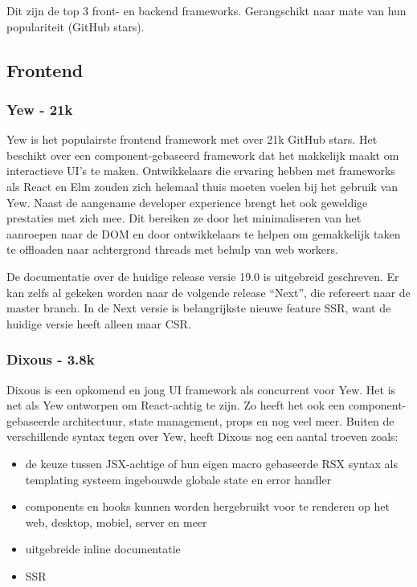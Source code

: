 Dit zijn de top 3 front- en backend frameworks. Gerangschikt naar mate van hun populariteit (GitHub
stars).

\subsection{Frontend}

\subsubsection{Yew - 21k} 

Yew is het populairste frontend framework met over 21k GitHub stars. Het beschikt
over een component-gebaseerd framework dat het makkelijk maakt om interactieve UI’s te maken.
Ontwikkelaars die ervaring hebben met frameworks als React en Elm zouden zich helemaal thuis moeten
voelen bij het gebruik van Yew. Naast de aangename developer experience brengt het ook geweldige
prestaties met zich mee. Dit bereiken ze door het minimaliseren van het aanroepen naar de DOM en
door ontwikkelaars te helpen om gemakkelijk taken te offloaden naar achtergrond threads met behulp
van web workers. 

De documentatie over de huidige release versie 19.0 is uitgebreid geschreven.  Er kan zelfs al
gekeken worden naar de volgende release “Next”, die refereert naar de master branch. In de Next
versie is belangrijkste nieuwe feature SSR, want de huidige versie heeft alleen maar CSR.

\clearpage

\subsubsection{Dixous - 3.8k}

Dixous is een opkomend en jong UI framework als concurrent voor Yew. Het is net als Yew ontworpen om
React-achtig te zijn. Zo heeft het ook een component-gebaseerde architectuur, state management,
props en nog veel meer. Buiten de verschillende syntax tegen over Yew, heeft Dixous nog een aantal
troeven zoals:  
\begin{itemize}
  \item de keuze tussen JSX-achtige of hun eigen macro gebaseerde RSX syntax als templating systeem
    ingebouwde globale state en error handler 

  \item components en hooks kunnen worden hergebruikt voor te renderen op het web, desktop, mobiel,
    server en meer 

  \item uitgebreide inline documentatie 

  \item SSR 
\end{itemize}

